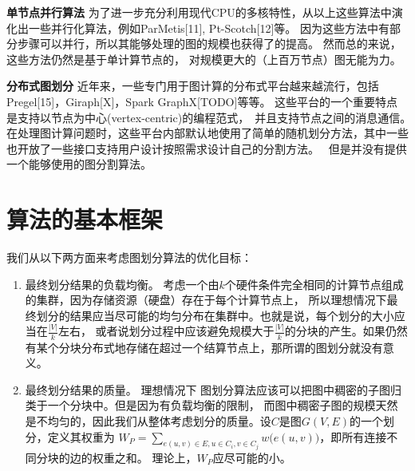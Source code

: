 \documentclass[master]{njuthesis}
\begin{document}
\textbf{单节点并行算法} 为了进一步充分利用现代CPU的多核特性，从以上这些算法中演化出一些并行化算法，例如ParMetis[11], Pt-Scotch[12]等。 
因为这些方法中有部分步骤可以并行，所以其能够处理的图的规模也获得了的提高。 
然而总的来说，这些方法仍然是基于单计算节点的， 对规模更大的（上百万节点）图无能为力。

\textbf{分布式图划分} 近年来，一些专门用于图计算的分布式平台越来越流行，包括Pregel[15]，Giraph[X]，Spark GraphX[TODO]等等。
这些平台的一个重要特点是支持以节点为中心(vertex-centric)的编程范式，　并且支持节点之间的消息通信。　
在处理图计算问题时，这些平台内部默认地使用了简单的随机划分方法，其中一些也开放了一些接口支持用户设计按照需求设计自己的分割方法。　
但是并没有提供一个能够使用的图分割算法。

\section{算法的基本框架}
我们从以下两方面来考虑图划分算法的优化目标：
\begin{enumerate}
 \item 最终划分结果的负载均衡。 考虑一个由$k$个硬件条件完全相同的计算节点组成的集群，因为存储资源（硬盘）存在于每个计算节点上，
 所以理想情况下最终划分的结果应当尽可能的均匀分布在集群中。也就是说，每个划分的大小应当在$\frac{|V|}{k}$左右，
 或者说划分过程中应该避免规模大于$\frac{|V|}{k}$的分块的产生。如果仍然有某个分块分布式地存储在超过一个结算节点上，那所谓的图划分就没有意义。
 \item 最终划分结果的质量。 理想情况下	图划分算法应该可以把图中稠密的子图归类于一个分块中。但是因为有负载均衡的限制，
 而图中稠密子图的规模天然是不均匀的，因此我们从整体考虑划分的质量。设$C$是图$G(V,E)$的一个划分，定义其权重为
 $W_{P}=\sum\nolimits_{e(u,v) \in E, u \in C_i, v \in C_j} w\big(e(u,v)\big)$，即所有连接不同分块的边的权重之和。
 理论上，$W_P$应尽可能的小。
\end{enumerate}
\end{document}
